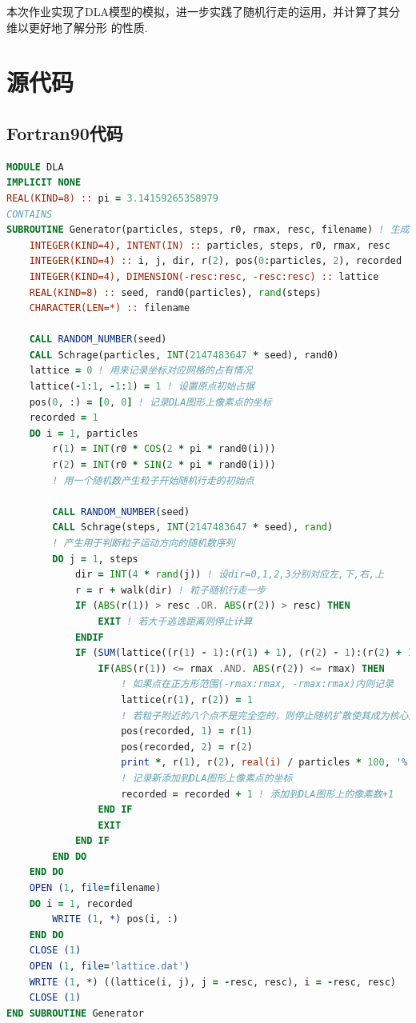 \documentclass[12pt,a4paper,utf8]{ctexart}
\begin{document}
本次作业实现了DLA模型的模拟，进一步实践了随机行走的运用，并计算了其分维以更好地了解分形
的性质.

\section{源代码}
\subsection{Fortran90代码}
\begin{framed}
\begin{lstlisting}[language=Fortran]
MODULE DLA
IMPLICIT NONE
REAL(KIND=8) :: pi = 3.14159265358979
CONTAINS
SUBROUTINE Generator(particles, steps, r0, rmax, resc, filename) ! 生成DLA图形的子程序
    INTEGER(KIND=4), INTENT(IN) :: particles, steps, r0, rmax, resc
    INTEGER(KIND=4) :: i, j, dir, r(2), pos(0:particles, 2), recorded
    INTEGER(KIND=4), DIMENSION(-resc:resc, -resc:resc) :: lattice
    REAL(KIND=8) :: seed, rand0(particles), rand(steps)
    CHARACTER(LEN=*) :: filename

    CALL RANDOM_NUMBER(seed)
    CALL Schrage(particles, INT(2147483647 * seed), rand0)
    lattice = 0 ! 用来记录坐标对应网格的占有情况
    lattice(-1:1, -1:1) = 1 ! 设置原点初始占据
    pos(0, :) = [0, 0] ! 记录DLA图形上像素点的坐标
    recorded = 1
    DO i = 1, particles
        r(1) = INT(r0 * COS(2 * pi * rand0(i)))
        r(2) = INT(r0 * SIN(2 * pi * rand0(i)))
        ! 用一个随机数产生粒子开始随机行走的初始点

        CALL RANDOM_NUMBER(seed)
        CALL Schrage(steps, INT(2147483647 * seed), rand)
        ! 产生用于判断粒子运动方向的随机数序列
        DO j = 1, steps
            dir = INT(4 * rand(j)) ! 设dir=0,1,2,3分别对应左,下,右,上
            r = r + walk(dir) ! 粒子随机行走一步
            IF (ABS(r(1)) > resc .OR. ABS(r(2)) > resc) THEN
                EXIT ! 若大于逃逸距离则停止计算
            ENDIF
            IF (SUM(lattice((r(1) - 1):(r(1) + 1), (r(2) - 1):(r(2) + 1))) .NE. 0) THEN
                IF(ABS(r(1)) <= rmax .AND. ABS(r(2)) <= rmax) THEN
                    ! 如果点在正方形范围(-rmax:rmax, -rmax:rmax)内则记录
                    lattice(r(1), r(2)) = 1 
                    ! 若粒子附近的八个点不是完全空的，则停止随机扩散使其成为核心的一部分
                    pos(recorded, 1) = r(1)
                    pos(recorded, 2) = r(2)
                    print *, r(1), r(2), real(i) / particles * 100, '%'
                    ! 记录新添加到DLA图形上像素点的坐标
                    recorded = recorded + 1 ! 添加到DLA图形上的像素数+1
                END IF
                EXIT
            END IF
        END DO
    END DO
    OPEN (1, file=filename)
    DO i = 1, recorded
        WRITE (1, *) pos(i, :)
    END DO
    CLOSE (1)
    OPEN (1, file='lattice.dat')
    WRITE (1, *) ((lattice(i, j), j = -resc, resc), i = -resc, resc)
    CLOSE (1)
END SUBROUTINE Generator  


\end{lstlisting}
\end{framed}
\end{document}
